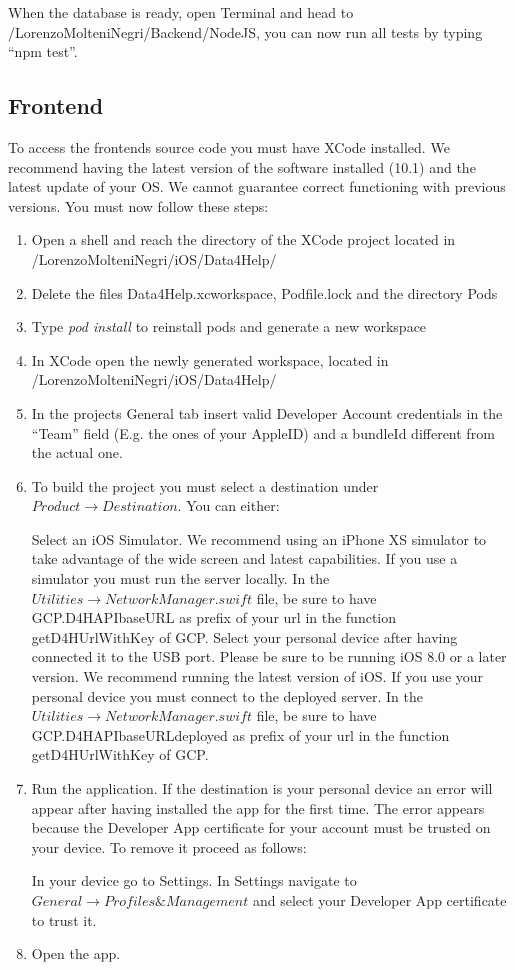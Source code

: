 \documentclass[titlepage]{article}
\begin{document}
	\noindent
	When the database is ready, open Terminal and head to /LorenzoMolteniNegri/Backend/NodeJS, you can now run all tests by typing “npm test”.
	
	\subsection{Frontend}
	To access the frontend\textsc{}s source code you must have XCode installed. We recommend having the latest version of the software installed (10.1) and the latest update of your OS. We cannot guarantee correct functioning with previous versions. You must now follow these steps:
	\begin{enumerate}
		\item Open a shell and reach the directory of the XCode project located in /LorenzoMolteniNegri/iOS/Data4Help/
		\item Delete the files Data4Help.xcworkspace, Podfile.lock and the directory Pods
		\item Type {\it pod install} to reinstall pods and generate a new workspace
		\item In XCode open the newly generated workspace, located in /LorenzoMolteniNegri/iOS/Data4Help/
		\item In the project\textsc{}s General tab insert valid Developer Account credentials in the “Team” field (E.g. the ones of your AppleID) and a bundleId different from the actual one.
		\item To build the project you must select a destination under $Product \rightarrow Destination$. You can either:
		\begin{tasks}
			\task Select an iOS Simulator. We recommend using an iPhone XS simulator to take advantage of the wide screen and latest capabilities. 
			If you use a simulator you must run the server locally. In the $Utilities \rightarrow NetworkManager.swift$ file, be sure to have GCP.D4HAPIbaseURL as prefix of your url in the function getD4HUrlWithKey of GCP. 
			\task Select your personal device after having connected it to the USB port. Please be sure to be running iOS 8.0 or a later version. We recommend running the latest version of iOS. If you use your personal device you must connect to the deployed server. In the $Utilities \rightarrow NetworkManager.swift$ file, be sure to have GCP.D4HAPIbaseURLdeployed as prefix of your url in the function getD4HUrlWithKey of GCP. 
		\end{tasks}
		\item Run the application. If the destination is your personal device an error will appear after having installed the app for the first time. The error appears because the Developer App certificate for your account must be trusted on your device. To remove it proceed as follows:
		\begin{tasks}
			\task In your device go to Settings.
			\task In Settings navigate to $General\rightarrow Profiles \& Management$ and select your Developer App certificate to trust it.
		\end{tasks}
		\item Open the app.
	\end{enumerate}
	
\end{document}
